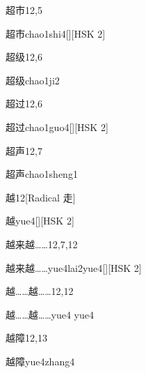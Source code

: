 \begin{entry}{超市}{12,5}
  \begin{phonetics}{超市}{chao1shi4}[][HSK 2]
  \end{phonetics}
\end{entry}

\begin{entry}{超级}{12,6}
  \begin{phonetics}{超级}{chao1ji2}
  \end{phonetics}
\end{entry}

\begin{entry}{超过}{12,6}
  \begin{phonetics}{超过}{chao1guo4}[][HSK 2]
  \end{phonetics}
\end{entry}

\begin{entry}{超声}{12,7}
  \begin{phonetics}{超声}{chao1sheng1}
  \end{phonetics}
\end{entry}

\begin{entry}{越}{12}[Radical 走]
  \begin{phonetics}{越}{yue4}[][HSK 2]
  \end{phonetics}
\end{entry}

\begin{entry}{越来越……}{12,7,12}
  \begin{phonetics}{越来越……}{yue4lai2yue4}[][HSK 2]
  \end{phonetics}
\end{entry}

\begin{entry}{越……越……}{12,12}
  \begin{phonetics}{越……越……}{yue4 yue4}
  \end{phonetics}
\end{entry}

\begin{entry}{越障}{12,13}
  \begin{phonetics}{越障}{yue4zhang4}
  \end{phonetics}
\end{entry}


